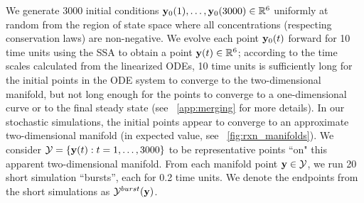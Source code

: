 We generate 3000 initial conditions $\mathbf{y}_0(1), \dots, \mathbf{y}_0(3000) \in \mathbb{R}^6$ uniformly at random from the
region of state space where all concentrations (respecting conservation laws) are non-negative.
%
We evolve each point $\mathbf{y}_0(t)$ forward for 10 time units using the SSA to obtain a point $\mathbf{y}(t) \in \mathbb{R}^6$;
according to the time scales calculated from the linearized ODEs, 10 time units is sufficiently long for the initial points in the ODE system to converge to the two-dimensional manifold,
but not long enough for the points to converge to a one-dimensional curve or to the final steady state (see \app~\ref{app:merging} for more details).
%
In our stochastic simulations, the initial points appear to converge to an approximate two-dimensional manifold
(in expected value, see \fig~\ref{fig:rxn_manifolds}).
%
We consider $\mathcal{Y} = \{ \mathbf{y}(t): t=1, \dots, 3000 \}$ to be representative points ``on" this apparent two-dimensional manifold.
%
From each manifold point $\mathbf{y} \in \mathcal{Y}$, we run 20 short simulation ``bursts'', each for 0.2 time units.
%
We denote the endpoints from the short simulations as $\mathcal{Y}^{burst}(\mathbf{y})$.

